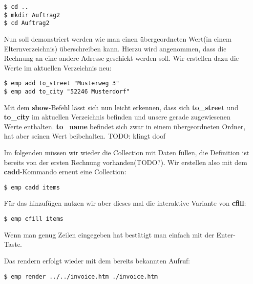 \begin{lstlisting}[style=Bash]
$ cd ..
$ mkdir Auftrag2
$ cd Auftrag2
\end{lstlisting}

Nun soll demonstriert werden wie man einen übergeordneten Wert(in einem Elternverzeichnis) überschreiben kann. Hierzu wird angenommen, dass die Rechnung an eine andere Adresse geschickt werden soll. Wir erstellen dazu die Werte im aktuellen Verzeichnis neu:

\begin{lstlisting}[style=Bash]
$ emp add to_street "Musterweg 3"
$ emp add to_city "52246 Musterdorf"
\end{lstlisting}

Mit dem \textbf{show}-Befehl lässt sich nun leicht erkennen, dass sich \textbf{to\_street} und \textbf{to\_city} im aktuellen Verzeichnis befinden und unsere gerade zugewiesenen Werte enthalten.
\textbf{to\_name} befindet sich zwar in einem übergeordneten Ordner, hat aber seinen Wert beibehalten. TODO: klingt doof  

Im folgenden müssen wir wieder die Collection mit Daten füllen, die Definition ist bereits von der ersten Rechnung vorhanden(TODO?). Wir erstellen also mit dem \textbf{cadd}-Kommando erneut eine Collection:
\begin{lstlisting}[style=Bash]
$ emp cadd items
\end{lstlisting}

Für das hinzufügen nutzen wir aber dieses mal die interaktive Variante von \textbf{cfill}:
\begin{lstlisting}[style=Bash]
$ emp cfill items
\end{lstlisting}
Wenn man genug Zeilen eingegeben hat bestätigt man einfach mit der Enter-Taste.

Das rendern erfolgt wieder mit dem bereits bekannten Aufruf:

\begin{lstlisting}[style=Bash]
$ emp render ../../invoice.htm ./invoice.htm
\end{lstlisting}
